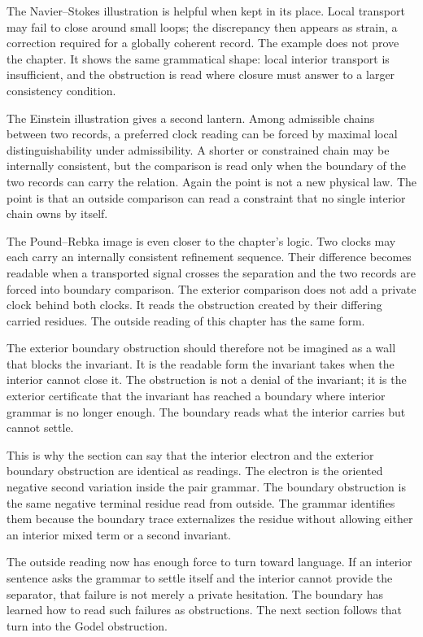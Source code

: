 The Navier--Stokes illustration is helpful when kept in its place. Local
transport may fail to close around small loops; the discrepancy then appears
as strain, a correction required for a globally coherent record. The example
does not prove the chapter. It shows the same grammatical shape: local
interior transport is insufficient, and the obstruction is read where closure
must answer to a larger consistency condition.

The Einstein illustration gives a second lantern. Among admissible chains
between two records, a preferred clock reading can be forced by maximal local
distinguishability under admissibility. A shorter or constrained chain may be
internally consistent, but the comparison is read only when the boundary of
the two records can carry the relation. Again the point is not a new physical
law. The point is that an outside comparison can read a constraint that no
single interior chain owns by itself.

The Pound--Rebka image is even closer to the chapter's logic. Two clocks may
each carry an internally consistent refinement sequence. Their difference
becomes readable when a transported signal crosses the separation and the
two records are forced into boundary comparison. The exterior comparison
does not add a private clock behind both clocks. It reads the obstruction
created by their differing carried residues. The outside reading of this
chapter has the same form.

The exterior boundary obstruction should therefore not be imagined as a wall
that blocks the invariant. It is the readable form the invariant takes when
the interior cannot close it. The obstruction is not a denial of the
invariant; it is the exterior certificate that the invariant has reached a
boundary where interior grammar is no longer enough. The boundary reads what
the interior carries but cannot settle.

This is why the section can say that the interior electron and the exterior
boundary obstruction are identical as readings. The electron is the oriented
negative second variation inside the pair grammar. The boundary obstruction
is the same negative terminal residue read from outside. The grammar
identifies them because the boundary trace externalizes the residue without
allowing either an interior mixed term or a second invariant.

The outside reading now has enough force to turn toward language. If an
interior sentence asks the grammar to settle itself and the interior cannot
provide the separator, that failure is not merely a private hesitation. The
boundary has learned how to read such failures as obstructions. The next
section follows that turn into the Godel obstruction.

